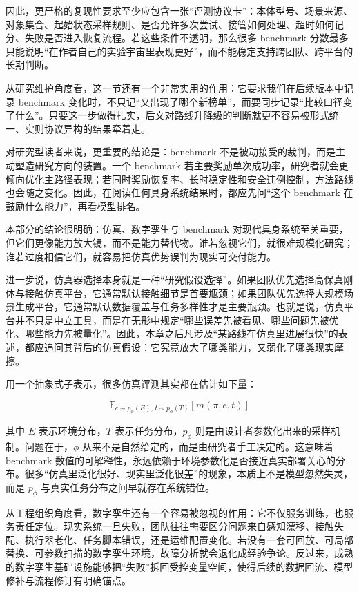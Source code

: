 因此，更严格的复现性要求至少应包含一张“评测协议卡”：本体型号、场景来源、对象集合、起始状态采样规则、是否允许多次尝试、接管如何处理、超时如何记分、失败是否进入恢复流程。若这些条件不透明，那么很多 benchmark 分数最多只能说明“在作者自己的实验宇宙里表现更好”，而不能稳定支持跨团队、跨平台的长期判断。

从研究维护角度看，这一节还有一个非常实用的作用：它要求我们在后续版本中记录 benchmark 变化时，不只记“又出现了哪个新榜单”，而要同步记录“比较口径变了什么”。只要这一步做得扎实，后文对路线升降级的判断就更不容易被形式统一、实则协议异构的结果牵着走。

对研究型读者来说，更重要的结论是：benchmark 不是被动接受的裁判，而是主动塑造研究方向的装置。一个 benchmark 若主要奖励单次成功率，研究者就会更倾向优化主路径表现；若同时奖励恢复率、长时稳定性和安全违例控制，方法路线也会随之变化。因此，在阅读任何具身系统结果时，都应先问“这个 benchmark 在鼓励什么能力”，再看模型排名。

本部分的结论很明确：仿真、数字孪生与 benchmark 对现代具身系统至关重要，但它们更像能力放大镜，而不是能力替代物。谁若忽视它们，就很难规模化研究；谁若过度相信它们，就容易把仿真优势误判为现实可交付能力。

进一步说，仿真器选择本身就是一种“研究假设选择”。如果团队优先选择高保真刚体与接触仿真平台，它通常默认接触细节是首要瓶颈；如果团队优先选择大规模场景生成平台，它通常默认数据覆盖与任务多样性才是主要瓶颈。也就是说，仿真平台并不只是中立工具，而是在无形中规定“哪些误差先被看见、哪些问题先被优化、哪些能力先被量化”。因此，本章之后凡涉及“某路线在仿真里进展很快”的表述，都应追问其背后的仿真假设：它究竟放大了哪类能力，又弱化了哪类现实摩擦。

用一个抽象式子表示，很多仿真评测其实都在估计如下量：

\begingroup
\footnotesize
\begin{equation*}
\mathbb{E}_{e \sim p_{\phi}(E),\, t \sim p_{\phi}(T)} [m(\pi, e, t)]
\end{equation*}
\endgroup

其中 \(E\) 表示环境分布，\(T\) 表示任务分布，\(p_{\phi}\) 则是由设计者参数化出来的采样机制。问题在于，\(\phi\) 从来不是自然给定的，而是由研究者手工决定的。这意味着 benchmark 数值的可解释性，永远依赖于环境参数化是否接近真实部署关心的分布。很多“仿真里泛化很好、现实里泛化很差”的现象，本质上不是模型忽然失灵，而是 \(p_{\phi}\) 与真实任务分布之间早就存在系统错位。

从工程组织角度看，数字孪生还有一个容易被忽视的作用：它不仅服务训练，也服务责任定位。现实系统一旦失败，团队往往需要区分问题来自感知漂移、接触失配、执行器老化、任务脚本错误，还是运维配置变化。若没有一套可回放、可局部替换、可参数扫描的数字孪生环境，故障分析就会退化成经验争论。反过来，成熟的数字孪生基础设施能够把“失败”拆回受控变量空间，使得后续的数据回流、模型修补与流程修订有明确锚点。

